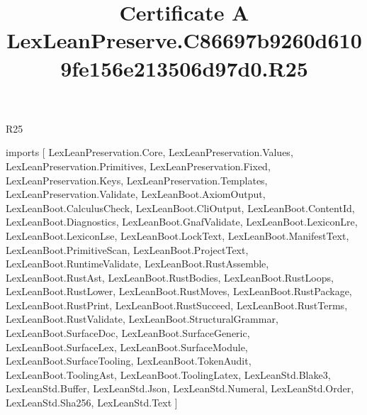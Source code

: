 \begin{lexlean}{R25}
\title{Certificate A LexLeanPreserve.C86697b9260d6109fe156e213506d97d0.R25}
\begin{coremodule}
imports [
  LexLeanPreservation.Core,
  LexLeanPreservation.Values,
  LexLeanPreservation.Primitives,
  LexLeanPreservation.Fixed,
  LexLeanPreservation.Keys,
  LexLeanPreservation.Templates,
  LexLeanPreservation.Validate,
  LexLeanBoot.AxiomOutput,
  LexLeanBoot.CalculusCheck,
  LexLeanBoot.CliOutput,
  LexLeanBoot.ContentId,
  LexLeanBoot.Diagnostics,
  LexLeanBoot.GnafValidate,
  LexLeanBoot.LexiconLre,
  LexLeanBoot.LexiconLse,
  LexLeanBoot.LockText,
  LexLeanBoot.ManifestText,
  LexLeanBoot.PrimitiveScan,
  LexLeanBoot.ProjectText,
  LexLeanBoot.RuntimeValidate,
  LexLeanBoot.RustAssemble,
  LexLeanBoot.RustAst,
  LexLeanBoot.RustBodies,
  LexLeanBoot.RustLoops,
  LexLeanBoot.RustLower,
  LexLeanBoot.RustMoves,
  LexLeanBoot.RustPackage,
  LexLeanBoot.RustPrint,
  LexLeanBoot.RustSucceed,
  LexLeanBoot.RustTerms,
  LexLeanBoot.RustValidate,
  LexLeanBoot.StructuralGrammar,
  LexLeanBoot.SurfaceDoc,
  LexLeanBoot.SurfaceGeneric,
  LexLeanBoot.SurfaceLex,
  LexLeanBoot.SurfaceModule,
  LexLeanBoot.SurfaceTooling,
  LexLeanBoot.TokenAudit,
  LexLeanBoot.ToolingAst,
  LexLeanBoot.ToolingLatex,
  LexLeanStd.Blake3,
  LexLeanStd.Buffer,
  LexLeanStd.Json,
  LexLeanStd.Numeral,
  LexLeanStd.Order,
  LexLeanStd.Sha256,
  LexLeanStd.Text
]


\end{coremodule}
\end{lexlean}
